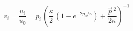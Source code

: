 \begin{equation}\label{13}
 v_i = \frac{u_i}{u_0} = p_i\,
 \left(\frac\kappa2\, \left(1 -e^{-2  {p_0}/\kappa}\right) +\frac{\vec{p}\,{}^2}{2\kappa}\right)^{-1}
\end{equation}


